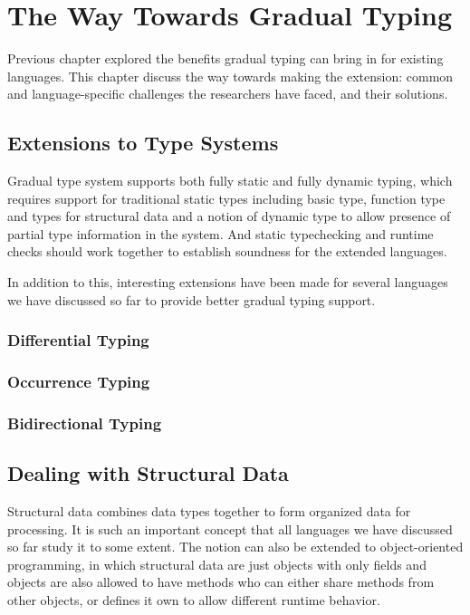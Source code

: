 
\renewcommand{\thechapter}{3}

\chapter{The Way Towards Gradual Typing}

Previous chapter explored the benefits gradual typing
can bring in for existing languages.
This chapter discuss the way towards making the extension:
common and language-specific challenges the researchers have faced,
and their solutions.

\section{Extensions to Type Systems}

Gradual type system supports both fully static and fully dynamic typing,
which requires support for traditional static types including
basic type, function type and types for structural data
and a notion of dynamic type to allow presence of partial type information
in the system. And static typechecking and runtime checks should work together
to establish soundness for the extended languages.

In addition to this, interesting extensions have been made
for several languages we have discussed so far to provide better gradual
typing support.

\subsection{Differential Typing}

\subsection{Occurrence Typing}

\subsection{Bidirectional Typing}

\section{Dealing with Structural Data}

Structural data combines data types together to form organized data for processing.
It is such an important concept that all languages we have discussed so far study
it to some extent. The notion can also be extended to object-oriented programming,
in which structural data are just objects with only fields and objects are also
allowed to have methods who can either share methods from other objects,
or defines it own to allow different runtime behavior.

